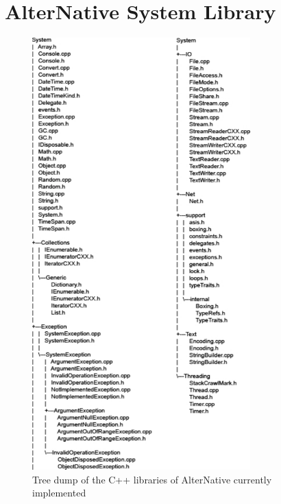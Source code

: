 \section{AlterNative System Library}\label{SS:Libs-AlterNative}
\begin{figure}[H]\begin{center}
 \centering
  \captionsetup{justification=centering}
  \includegraphics[width=0.75\textwidth]{pictures/appendices/alternative-cpp-classes}
  \caption{Tree dump of the C++ libraries of AlterNative currently implemented\label{fig:Libs-AlterNative}}
\end{center}\end{figure}